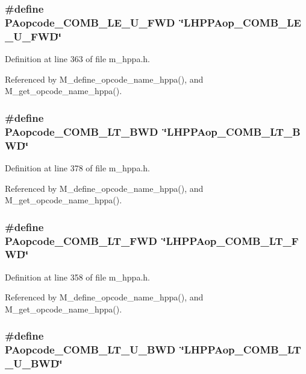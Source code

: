 \subsubsection{\setlength{\rightskip}{0pt plus 5cm}\#define PAopcode\_\-COMB\_\-LE\_\-U\_\-FWD~\char`\"{}LHPPAop\_\-COMB\_\-LE\_\-U\_\-FWD\char`\"{}}\label{m__hppa_8h_0fc9e937b09fe15c10dbfb290c71bfb2}




Definition at line 363 of file m\_\-hppa.h.

Referenced by M\_\-define\_\-opcode\_\-name\_\-hppa(), and M\_\-get\_\-opcode\_\-name\_\-hppa().
\subsubsection{\setlength{\rightskip}{0pt plus 5cm}\#define PAopcode\_\-COMB\_\-LT\_\-BWD~\char`\"{}LHPPAop\_\-COMB\_\-LT\_\-BWD\char`\"{}}\label{m__hppa_8h_2f2ab23eddc644b5942885554c599361}




Definition at line 378 of file m\_\-hppa.h.

Referenced by M\_\-define\_\-opcode\_\-name\_\-hppa(), and M\_\-get\_\-opcode\_\-name\_\-hppa().
\subsubsection{\setlength{\rightskip}{0pt plus 5cm}\#define PAopcode\_\-COMB\_\-LT\_\-FWD~\char`\"{}LHPPAop\_\-COMB\_\-LT\_\-FWD\char`\"{}}\label{m__hppa_8h_797d0b6bf7b0a873c8835cbd0dee4b21}




Definition at line 358 of file m\_\-hppa.h.

Referenced by M\_\-define\_\-opcode\_\-name\_\-hppa(), and M\_\-get\_\-opcode\_\-name\_\-hppa().
\subsubsection{\setlength{\rightskip}{0pt plus 5cm}\#define PAopcode\_\-COMB\_\-LT\_\-U\_\-BWD~\char`\"{}LHPPAop\_\-COMB\_\-LT\_\-U\_\-BWD\char`\"{}}\label{m__hppa_8h_542456098ce8e21516ae619b46d6dba5}




